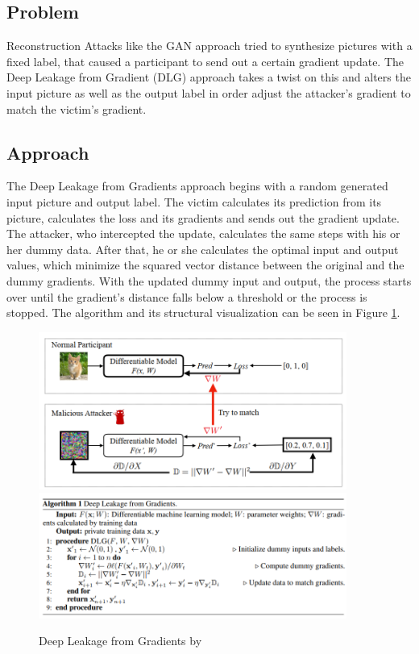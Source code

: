 \documentclass[
	ngerman,
	ruledheaders=section,%
	class=report,%
	thesis={type=bachelor},%
	accentcolor=1b,%
	custommargins=true,%
	marginpar=false,%
	parskip=half-,%
	fontsize=11pt,%
]{tudapub}
\begin{document}
\subsection{Problem}
Reconstruction Attacks like the GAN approach tried to synthesize pictures with a fixed label, that caused a participant to send out a certain gradient update. The Deep Leakage from Gradient (DLG) approach \cite{zhu2019deep} takes a twist on this and alters the input picture as well as the output label in order adjust the attacker's gradient to match the victim's gradient.

\subsection{Approach}
The Deep Leakage from Gradients approach begins with a random generated input picture and output label. The victim calculates its prediction from its picture, calculates the loss and its gradients and sends out the gradient update. The attacker, who intercepted the update, calculates the same steps with his or her dummy data. After that, he or she calculates the optimal input and output values, which minimize the squared vector distance between the original and the dummy gradients. With the updated dummy input and output, the process starts over until the gradient's distance falls below a threshold or the process is stopped. The algorithm and its structural visualization can be seen in Figure \ref{fig:dlg}.

\begin{figure}[H] 
  \centering
    \includegraphics[width=0.9\textwidth]{Figures/DLG_structure.PNG}\\
    \includegraphics[width=0.9\textwidth]{Figures/DLG.PNG}
  \caption{Deep Leakage from Gradients by \cite{zhu2019deep}}
  \label{fig:dlg}
\end{figure}
\end{document}
